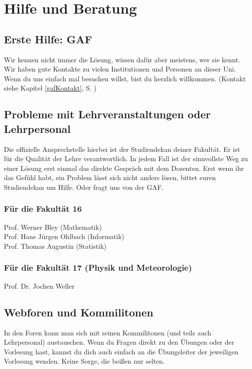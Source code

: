 ﻿\chapter{Hilfe und Beratung}

\section{Erste Hilfe: GAF}

Wir kennen nicht immer die Lösung, wissen dafür aber meistens, wer sie
kennt. Wir haben gute Kontakte zu vielen Institutionen und Personen an
dieser Uni. Wenn du uns einfach mal besuchen willst, bist du herzlich
willkommen. (Kontakt siehe Kapitel \ref{gafKontakt}, S. \pageref{gafKontakt})

\section{Probleme mit Lehrveranstaltungen oder Lehrpersonal}

Die offizielle Ansprechstelle hierbei ist der Studiendekan deiner
Fakultät. Er ist für die Qualität der Lehre verantwortlich. In jedem
Fall ist der sinnvollste Weg zu einer Lösung erst einmal das direkte
Gespräch mit dem Dozenten. Erst wenn ihr das Gefühl habt, ein Problem
lässt sich nicht anders lösen, bittet euren Studiendekan um
Hilfe. Oder fragt uns von der GAF.

\subsection*{Für die Fakultät 16}
Prof. Werner Bley (Mathematik)\\ %
Prof. Hans Jürgen Ohlbach (Informatik)\\
Prof. Thomas Augustin (Statistik)%

\subsection*{Für die Fakultät 17 (Physik und Meteorologie)}
Prof. Dr. Jochen Weller

\section{Webforen und Kommilitonen}

In den Foren kann man sich mit seinen Kommilitonen
(und teils auch Lehrpersonal) austauschen. Wenn du Fragen direkt zu den
Übungen oder der Vorlesung hast, kannst du dich auch einfach an die
Übungsleiter der jeweiligen Vorlesung wenden. Keine Sorge, die beißen nur
selten.\\

